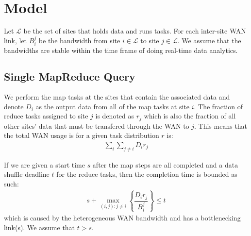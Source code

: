 \section{Model}
\label{sec:model}

Let $\mathcal{L}$ be the set of sites that holds data and runs tasks.
For each inter-site WAN link, let $B_{i}^{j}$ be the bandwidth from site $i\in\mathcal{L}$ to site $j\in\mathcal{L}$.
We assume that the bandwidths are stable within the time frame of doing real-time data analytics.

\subsection{Single MapReduce Query}
We perform the map tasks at the sites that contain the associated data and denote $D_{i}$ as the output data from all of the map tasks at site $i$.
The fraction of reduce tasks assigned to site $j$ is denoted as $r_{j}$ which is also the fraction of all other sites' data that must be transfered through the WAN to $j$.
This means that the total WAN usage is for a given task distribution $r$ is:
\begin{align}
	\sum_{i}\sum_{j\neq i}D_{i}r_{j}
\end{align}

If we are given a start time $s$ after the map steps are all completed and a data shuffle deadline $t$ for the reduce tasks, then the completion time is bounded as such:
\begin{align}
	s + \max_{(i,j):j\neq i} \left\{\dfrac{D_{i}r_{j}}{B_{i}^{j}}\right\} \leq t
\end{align}
which is caused by the heterogeneous WAN bandwidth and has a bottlenecking link(s).
We assume that $t>s$.